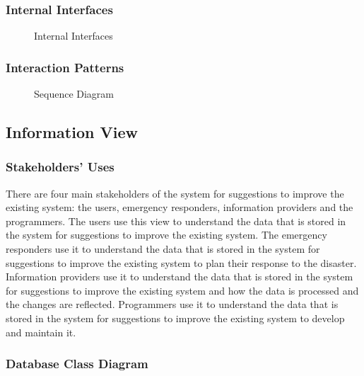 \documentclass[a4paper]{article}
\begin{document}
    \subsubsection{Internal Interfaces}
    \begin{figure}
        
        \caption{Internal Interfaces}
    \end{figure}
    \subsubsection{Interaction Patterns}
    \begin{figure}
        
        \caption{Sequence Diagram}
    \end{figure}
    \subsection{Information View}
    \subsubsection{Stakeholders' Uses}
    There are four main stakeholders of the system for suggestions to improve the existing system: the users, emergency responders,
    information providers and the programmers. The users use this view to understand the data that is stored in the system for
    suggestions to improve the existing system. The emergency responders use it to understand the data that is stored in the system
    for suggestions to improve the existing system to plan their response to the disaster. Information providers use it to
    understand the data that is stored in the system for suggestions to improve the existing system and how the data is processed
    and the changes are reflected. Programmers use it to understand the data that is stored in the system for suggestions to
    improve the existing system to develop and maintain it.
    \subsubsection{Database Class Diagram}
\end{document}
